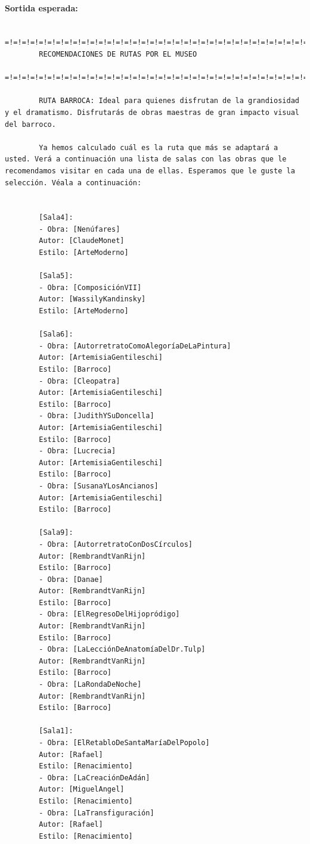 \documentclass[a4paper]{article}
\begin{document}
	\paragraph{Sortida esperada:}
	\begin{verbatim}
		 =!=!=!=!=!=!=!=!=!=!=!=!=!=!=!=!=!=!=!=!=!=!=!=!=!=!=!=!=!=!=!=!=!=!=!= 
		RECOMENDACIONES DE RUTAS POR EL MUSEO                     
		=!=!=!=!=!=!=!=!=!=!=!=!=!=!=!=!=!=!=!=!=!=!=!=!=!=!=!=!=!=!=!=!=!=!=!= 
		
		RUTA BARROCA: Ideal para quienes disfrutan de la grandiosidad y el dramatismo. Disfrutarás de obras maestras de gran impacto visual del barroco.
		
		Ya hemos calculado cuál es la ruta que más se adaptará a usted. Verá a continuación una lista de salas con las obras que le recomendamos visitar en cada una de ellas. Esperamos que le guste la selección. Véala a continuación:
		
		
		[Sala4]:
		- Obra: [Nenúfares]
		Autor: [ClaudeMonet]
		Estilo: [ArteModerno]
		
		[Sala5]:
		- Obra: [ComposiciónVII]
		Autor: [WassilyKandinsky]
		Estilo: [ArteModerno]
		
		[Sala6]:
		- Obra: [AutorretratoComoAlegoríaDeLaPintura]
		Autor: [ArtemisiaGentileschi]
		Estilo: [Barroco]
		- Obra: [Cleopatra]
		Autor: [ArtemisiaGentileschi]
		Estilo: [Barroco]
		- Obra: [JudithYSuDoncella]
		Autor: [ArtemisiaGentileschi]
		Estilo: [Barroco]
		- Obra: [Lucrecia]
		Autor: [ArtemisiaGentileschi]
		Estilo: [Barroco]
		- Obra: [SusanaYLosAncianos]
		Autor: [ArtemisiaGentileschi]
		Estilo: [Barroco]
		
		[Sala9]:
		- Obra: [AutorretratoConDosCírculos]
		Autor: [RembrandtVanRijn]
		Estilo: [Barroco]
		- Obra: [Danae]
		Autor: [RembrandtVanRijn]
		Estilo: [Barroco]
		- Obra: [ElRegresoDelHijopródigo]
		Autor: [RembrandtVanRijn]
		Estilo: [Barroco]
		- Obra: [LaLecciónDeAnatomíaDelDr.Tulp]
		Autor: [RembrandtVanRijn]
		Estilo: [Barroco]
		- Obra: [LaRondaDeNoche]
		Autor: [RembrandtVanRijn]
		Estilo: [Barroco]
		
		[Sala1]:
		- Obra: [ElRetabloDeSantaMaríaDelPopolo]
		Autor: [Rafael]
		Estilo: [Renacimiento]
		- Obra: [LaCreaciónDeAdán]
		Autor: [MiguelAngel]
		Estilo: [Renacimiento]
		- Obra: [LaTransfiguración]
		Autor: [Rafael]
		Estilo: [Renacimiento]
		

\end{verbatim}
\end{document}
